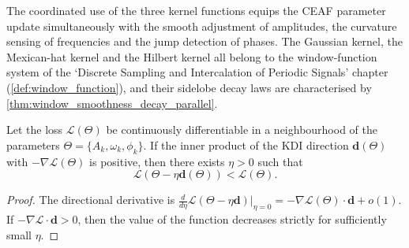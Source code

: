 \begin{definition}
\begin{enumerate}[label=(\roman*)]
\end{enumerate}
The coordinated use of the three kernel functions equips the CEAF parameter update simultaneously with the smooth adjustment of amplitudes, the curvature sensing of frequencies and the jump detection of phases. The Gaussian kernel, the Mexican-hat kernel and the Hilbert kernel all belong to the window-function system of the `Discrete Sampling and Intercalation of Periodic Signals' chapter (\cref{def:window_function}), and their sidelobe decay laws are characterised by \cref{thm:window_smoothness_decay_parallel}.
\end{definition}

\begin{proposition}\label{prop:kdi_epicycle_descent_agent}
Let the loss $\mathcal{L}(\Theta)$ be continuously differentiable in a neighbourhood of the parameters $\Theta = \{A_k, \omega_k, \phi_k\}$. If the inner product of the KDI direction $\mathbf{d}(\Theta)$ with $-\nabla\mathcal{L}(\Theta)$ is positive, then there exists $\eta > 0$ such that
\[
\mathcal{L}(\Theta - \eta\mathbf{d}(\Theta)) < \mathcal{L}(\Theta).
\]
\end{proposition}

\begin{proof}
The directional derivative is $\frac{d}{d\eta}\mathcal{L}(\Theta - \eta\mathbf{d})|_{\eta=0} = -\nabla\mathcal{L}(\Theta)\cdot\mathbf{d} + o(1)$. If $-\nabla\mathcal{L}\cdot\mathbf{d} > 0$, then the value of the function decreases strictly for sufficiently small $\eta$.
\end{proof}

